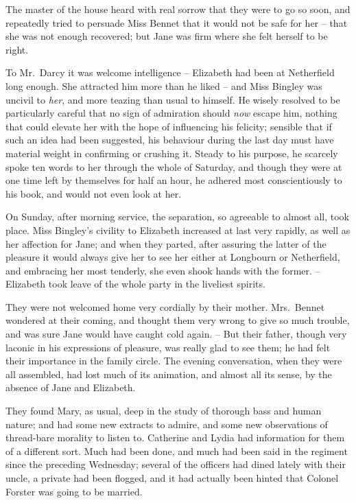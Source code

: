 The master of the house heard with real sorrow that
they were to go so soon, and repeatedly tried to persuade
Miss Bennet that it would not be safe for her -- that she
was not enough recovered; but Jane was firm where she
felt herself to be right.

To Mr.\ Darcy it was welcome intelligence -- Elizabeth
had been at Netherfield long enough. She attracted him
more than he liked -- and Miss Bingley was uncivil to \textit{her},
and more teazing than usual to himself. He wisely
resolved to be particularly careful that no sign of admiration
should \textit{now} escape him, nothing that could elevate
her with the hope of influencing his felicity; sensible that
if such an idea had been suggested, his behaviour during
the last day must have material weight in confirming or
crushing it. Steady to his purpose, he scarcely spoke ten
words to her through the whole of Saturday, and though
they were at one time left by themselves for half an hour,
he adhered most conscientiously to his book, and would
not even look at her.

On Sunday, after morning service, the separation, so
agreeable to almost all, took place. Miss Bingley’s civility
to Elizabeth increased at last very rapidly, as well as her
affection for Jane; and when they parted, after assuring
the latter of the pleasure it would always give her to see her
either at Longbourn or Netherfield, and embracing her most
tenderly, she even shook hands with the former. -- Elizabeth
took leave of the whole party in the liveliest spirits.

They were not welcomed home very cordially by their
mother. Mrs.\ Bennet wondered at their coming, and
thought them very wrong to give so much trouble, and
was sure Jane would have caught cold again. -- But their
father, though very laconic in his expressions of pleasure,
was really glad to see them; he had felt their importance
in the family circle. The evening conversation, when they
were all assembled, had lost much of its animation, and
almost all its sense, by the absence of Jane and Elizabeth.

They found Mary, as usual, deep in the study of thorough
bass and human nature; and had some new extracts to
admire, and some new observations of thread-bare morality
to listen to. Catherine and Lydia had information for
them of a different sort. Much had been done, and much
had been said in the regiment since the preceding Wednesday;
several of the officers had dined lately with their
uncle, a private had been flogged, and it had actually
been hinted that Colonel Forster was going to be married.

